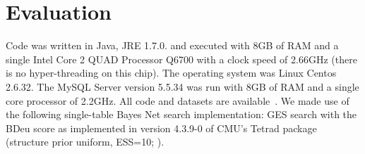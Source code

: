\documentclass{vldb}
\begin{document}
\section{Evaluation} 
Code was written in Java, JRE 1.7.0.  and executed with 8GB of RAM and a single Intel Core 2 QUAD Processor Q6700 with a clock speed of 2.66GHz (there is no hyper-threading on this chip). The operating system was Linux Centos 2.6.32. 
The MySQL Server version 5.5.34 was run with 8GB of RAM and a single core processor of 2.2GHz. 
All code and datasets are available~\cite{bib:jbnsite}.
We made use of the following single-table Bayes Net search implementation:  GES search \cite{Chickering2003} with the BDeu score as implemented in version 4.3.9-0 of CMU's Tetrad package (structure prior uniform, ESS=10; \cite{2008a}).
\begin{table}[hbtp] \centering
\caption{Datasets characteristics. \#Tuples = total number of tuples over all tables. 
  \label{table:datasetsize}}
\end{table}
\end{document}
